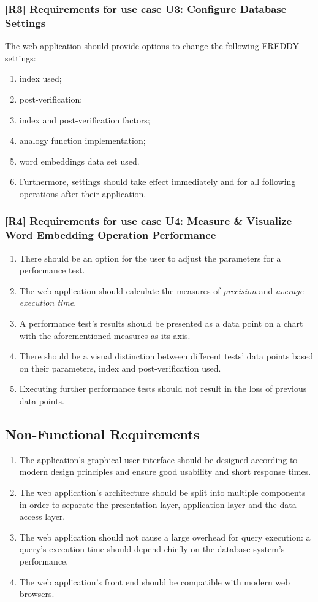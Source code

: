 \subsubsection{[R3] Requirements for use case U3: Configure Database Settings}
The web application should provide options to change the following FREDDY settings:
\begin{enumerate}[label=R3.\arabic*]
	\item index used;
	\item post-verification;
	\item index and post-verification factors;
	\item analogy function implementation;
	\item word embeddings data set used.
	\item Furthermore, settings should take effect immediately and for all following operations after their application.
\end{enumerate}

\subsubsection{[R4] Requirements for use case U4: Measure \& Visualize Word Embedding Operation Performance}
\begin{enumerate}[label=R4.\arabic*]
	\item There should be an option for the user to adjust the parameters for a performance test.
	\item The web application should calculate the measures of \textit{precision} and \textit{average execution time}.
	\item A performance test's results should be presented as a data point on a chart with the aforementioned measures as its axis.
	\item There should be a visual distinction between different tests' data points based on their parameters, index and post-verification used.
	\item Executing further performance tests should not result in the loss of previous data points.
\end{enumerate}

\subsection{Non-Functional Requirements}
\begin{enumerate}[label=N\arabic*]
	\item The application's graphical user interface should be designed according to modern design principles and ensure good usability and short response times.
	\item The web application's architecture should be split into multiple components in order to separate the presentation layer, application layer and the data access layer.
	\item The web application should not cause a large overhead for query execution: a query's execution time should depend chiefly on the database system's performance.
	\item The web application's front end should be compatible with modern web browsers.
\end{enumerate}

